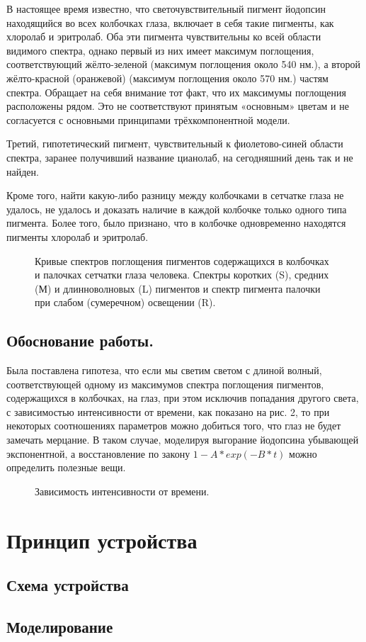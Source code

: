 \documentclass[a4paper,12pt]{article}
\begin{document}
В настоящее время известно, что светочувствительный пигмент йодопсин находящийся во всех колбочках глаза, включает в себя такие пигменты, как хлоролаб и эритролаб. Оба эти пигмента чувствительны ко всей области видимого спектра, однако первый из них имеет максимум поглощения, соответствующий жёлто-зеленой (максимум поглощения около 540 нм.), а второй жёлто-красной (оранжевой) (максимум поглощения около 570 нм.) частям спектра. Обращает на себя внимание тот факт, что их максимумы поглощения расположены рядом. Это не соответствуют принятым «основным» цветам и не согласуется с основными принципами трёхкомпонентной модели.


Третий, гипотетический пигмент, чувствительный к фиолетово-синей области спектра, заранее получивший название цианолаб, на сегодняшний день так и не найден.


Кроме того, найти какую-либо разницу между колбочками в сетчатке глаза не удалось, не удалось и доказать наличие в каждой колбочке только одного типа пигмента. Более того, было признано, что в колбочке одновременно находятся пигменты хлоролаб и эритролаб.
\begin{figure}[h]
\caption{Кривые спектров поглощения пигментов содержащихся в колбочках и палочках сетчатки глаза человека. Спектры коротких (S), средних (М) и длинноволновых (L) пигментов и спектр пигмента палочки при слабом (сумеречном) освещении (R).}
\label{ris:image}
\end{figure}

\subsection{Обоснование работы.}
Была поставлена гипотеза, что если мы светим светом с длиной волный, соответствующей одному из максимумов спектра поглощения пигментов, содержащихся в колбочках, на глаз, при этом исключив попадания другого света, с зависимостью интенсивности от времени, как показано на рис. 2, то при некоторых соотношениях параметров можно добиться того, что глаз не будет замечать мерцание. В таком случае, моделируя выгорание йодопсина убывающей экспонентной, а восстановление по закону $1-A*exp(-B*t)$ можно определить полезные вещи. 
\begin{figure}[h]
\caption{Зависимость интенсивности от времени.}
\label{ris:image1}
\end{figure}
\newpage
\section{Принцип устройства}
\subsection{Схема устройства}
\subsection{Моделирование}
\end{document}
